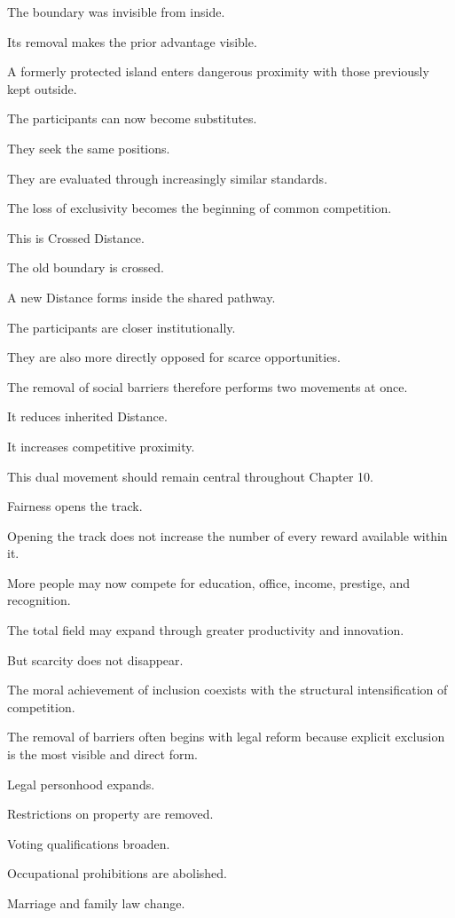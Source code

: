 The boundary was invisible from inside.

Its removal makes the prior advantage visible.

A formerly protected island enters dangerous proximity with those previously kept outside.

The participants can now become substitutes.

They seek the same positions.

They are evaluated through increasingly similar standards.

The loss of exclusivity becomes the beginning of common competition.

This is Crossed Distance.

The old boundary is crossed.

A new Distance forms inside the shared pathway.

The participants are closer institutionally.

They are also more directly opposed for scarce opportunities.

The removal of social barriers therefore performs two movements at once.

It reduces inherited Distance.

It increases competitive proximity.

This dual movement should remain central throughout Chapter 10.

Fairness opens the track.

Opening the track does not increase the number of every reward available within it.

More people may now compete for education, office, income, prestige, and recognition.

The total field may expand through greater productivity and innovation.

But scarcity does not disappear.

The moral achievement of inclusion coexists with the structural intensification of competition.

The removal of barriers often begins with legal reform because explicit exclusion is the most visible and direct form.

Legal personhood expands.

Restrictions on property are removed.

Voting qualifications broaden.

Occupational prohibitions are abolished.

Marriage and family law change.

